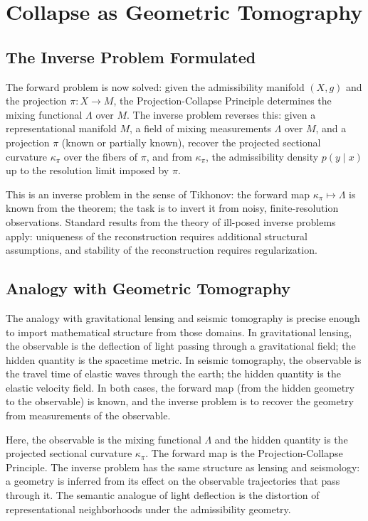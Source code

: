 \documentclass[12pt, oneside]{book}
\theoremstyle{plain-flyxion}
\theoremstyle{definition-flyxion}
\newcommand{\kpi}{\kappa_{\pi}}
\newcommand{\Lam}{\Lambda}
\begin{document}
\chapter{Collapse as Geometric Tomography}

\section{The Inverse Problem Formulated}

The forward problem is now solved: given the admissibility manifold $(X,g)$ and the
projection $\pi: X\to M$, the Projection-Collapse Principle determines the mixing
functional $\Lam$ over $M$. The inverse problem reverses this: given a representational
manifold $M$, a field of mixing measurements $\Lam$ over $M$, and a projection $\pi$
(known or partially known), recover the projected sectional curvature $\kpi$ over the
fibers of $\pi$, and from $\kpi$, the admissibility density $p(y\mid x)$ up to the
resolution limit imposed by $\pi$.

This is an inverse problem in the sense of Tikhonov: the forward map $\kpi\mapsto\Lam$
is known from the theorem; the task is to invert it from noisy, finite-resolution
observations. Standard results from the theory of ill-posed inverse problems apply:
uniqueness of the reconstruction requires additional structural assumptions, and stability
of the reconstruction requires regularization.

\section{Analogy with Geometric Tomography}

The analogy with gravitational lensing and seismic tomography is precise enough to
import mathematical structure from those domains. In gravitational lensing, the observable
is the deflection of light passing through a gravitational field; the hidden quantity is
the spacetime metric. In seismic tomography, the observable is the travel time of elastic
waves through the earth; the hidden quantity is the elastic velocity field. In both
cases, the forward map (from the hidden geometry to the observable) is known, and the
inverse problem is to recover the geometry from measurements of the observable.

Here, the observable is the mixing functional $\Lam$ and the hidden quantity is the
projected sectional curvature $\kpi$. The forward map is the Projection-Collapse
Principle. The inverse problem has the same structure as lensing and seismology: a
geometry is inferred from its effect on the observable trajectories that pass through it.
The semantic analogue of light deflection is the distortion of representational
neighborhoods under the admissibility geometry.
\end{document}
